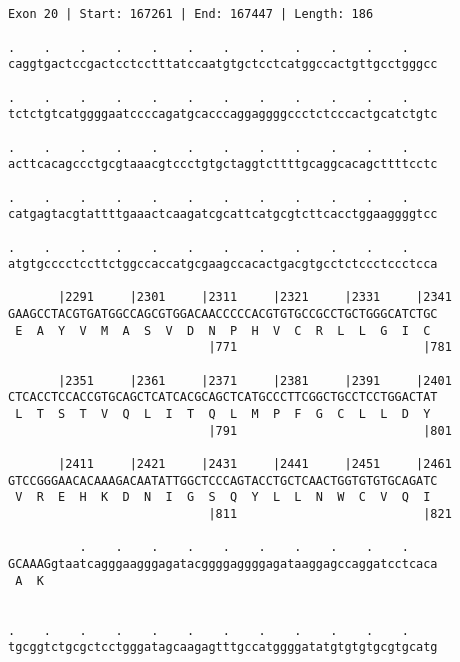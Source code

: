 \documentclass{article}
\begin{document}
\begin{Verbatim}
                                       
 
Exon 20 | Start: 167261 | End: 167447 | Length: 186
 
.    .    .    .    .    .    .    .    .    .    .    .    
caggtgactccgactcctcctttatccaatgtgctcctcatggccactgttgcctgggcc
                                                            
.    .    .    .    .    .    .    .    .    .    .    .    
tctctgtcatggggaatccccagatgcacccaggaggggccctctcccactgcatctgtc
                                                            
.    .    .    .    .    .    .    .    .    .    .    .    
acttcacagccctgcgtaaacgtccctgtgctaggtcttttgcaggcacagcttttcctc
                                                            
.    .    .    .    .    .    .    .    .    .    .    .    
catgagtacgtattttgaaactcaagatcgcattcatgcgtcttcacctggaaggggtcc
                                                            
.    .    .    .    .    .    .    .    .    .    .    .    
atgtgcccctccttctggccaccatgcgaagccacactgacgtgcctctccctccctcca
                                                            
       |2291     |2301     |2311     |2321     |2331     |2341
GAAGCCTACGTGATGGCCAGCGTGGACAACCCCCACGTGTGCCGCCTGCTGGGCATCTGC
 E  A  Y  V  M  A  S  V  D  N  P  H  V  C  R  L  L  G  I  C 
                            |771                          |781
  
       |2351     |2361     |2371     |2381     |2391     |2401
CTCACCTCCACCGTGCAGCTCATCACGCAGCTCATGCCCTTCGGCTGCCTCCTGGACTAT
 L  T  S  T  V  Q  L  I  T  Q  L  M  P  F  G  C  L  L  D  Y 
                            |791                          |801
  
       |2411     |2421     |2431     |2441     |2451     |2461
GTCCGGGAACACAAAGACAATATTGGCTCCCAGTACCTGCTCAACTGGTGTGTGCAGATC
 V  R  E  H  K  D  N  I  G  S  Q  Y  L  L  N  W  C  V  Q  I 
                            |811                          |821
  
          .    .    .    .    .    .    .    .    .    .    
GCAAAGgtaatcagggaagggagatacggggaggggagataaggagccaggatcctcaca
 A  K                                                       
                                                            
  
.    .    .    .    .    .    .    .    .    .    .    .    
tgcggtctgcgctcctgggatagcaagagtttgccatggggatatgtgtgtgcgtgcatg
                                                            

\end{Verbatim}
\end{document}
